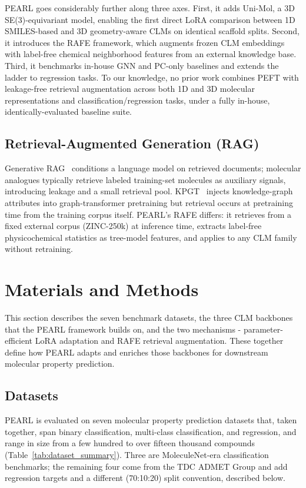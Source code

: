 \documentclass[pdflatex,sn-mathphys-num]{sn-jnl}%
\begin{document}
PEARL goes considerably further along three axes. First, it adds Uni-Mol, a 3D SE(3)-equivariant model, enabling the first direct LoRA comparison between 1D SMILES-based and 3D geometry-aware CLMs on identical scaffold splits. Second, it introduces the RAFE framework, which augments frozen CLM embeddings with label-free chemical neighborhood features from an external knowledge base. Third, it benchmarks in-house GNN and PC-only baselines and extends the ladder to regression tasks. To our knowledge, no prior work combines PEFT with leakage-free retrieval augmentation across both 1D and 3D molecular representations and classification/regression tasks, under a fully in-house, identically-evaluated baseline suite.

\subsection{Retrieval-Augmented Generation (RAG)}\label{sec:related_rag}
Generative RAG~\cite{lewis2020rag} conditions a language model on retrieved documents; molecular analogues typically retrieve labeled training-set molecules as auxiliary signals, introducing leakage and a small retrieval pool. KPGT~\cite{liu2022kpgt} injects knowledge-graph attributes into graph-transformer pretraining but retrieval occurs at pretraining time from the training corpus itself. PEARL's RAFE differs: it retrieves from a fixed external corpus (ZINC-250k) at inference time, extracts label-free physicochemical statistics as tree-model features, and applies to any CLM family without retraining.

\section{Materials and Methods}\label{sec:pearl_arch}
This section describes the seven benchmark datasets, the three CLM backbones that the PEARL framework builds on, and the two mechanisms - parameter-efficient LoRA adaptation and RAFE retrieval augmentation. These together define how PEARL adapts and enriches those backbones for downstream molecular property prediction.

\subsection{Datasets}\label{sec:datasets}
PEARL is evaluated on seven molecular property prediction datasets that, taken together, span binary classification, multi-class classification, and regression, and range in size from a few hundred to over fifteen thousand compounds (Table~\ref{tab:dataset_summary}). Three are MoleculeNet-era classification benchmarks; the remaining four come from the TDC ADMET Group and add regression targets and a different (70:10:20) split convention, described below.
\end{document}
